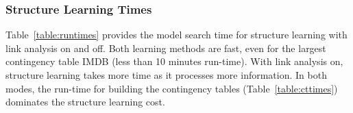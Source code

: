 \documentclass{acm_proc_article-sp}
\begin{document}
\subsubsection{Structure Learning Times} 
Table~\ref{table:runtimes} provides the model search time for structure learning with link analysis on and off. Both learning methods are fast, even for the largest contingency table  IMDB (less than 10 minutes run-time). With link analysis on, structure learning takes more time as it processes more information. 
In both modes, the run-time for building the contingency tables (Table~\ref{table:cttimes}) dominates the structure learning cost.
\end{document}
